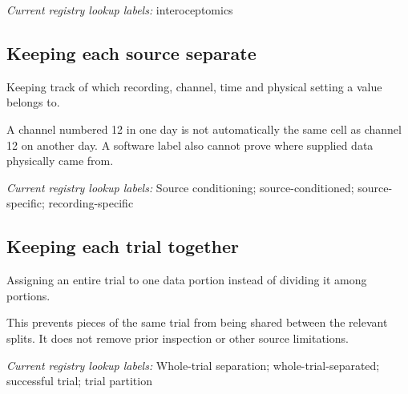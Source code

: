 \noindent\textit{Current registry lookup labels:} interoceptomics\par

\begin{samepage}
\subsection*{Keeping each source separate}
\noindent Keeping track of which recording, channel, time and physical setting a value belongs to.\par
\end{samepage}
\begin{samepage}
\noindent A channel numbered 12 in one day is not automatically the same cell as channel 12 on another day. A software label also cannot prove where supplied data physically came from.\par\nopagebreak[4]

\end{samepage}


\noindent\textit{Current registry lookup labels:} Source conditioning; source-conditioned; source-specific; recording-specific\par

\begin{samepage}
\subsection*{Keeping each trial together}
\noindent Assigning an entire trial to one data portion instead of dividing it among portions.\par
\end{samepage}
\begin{samepage}
\noindent This prevents pieces of the same trial from being shared between the relevant splits. It does not remove prior inspection or other source limitations.\par\nopagebreak[4]

\end{samepage}


\noindent\textit{Current registry lookup labels:} Whole-trial separation; whole-trial-separated; successful trial; trial partition\par

